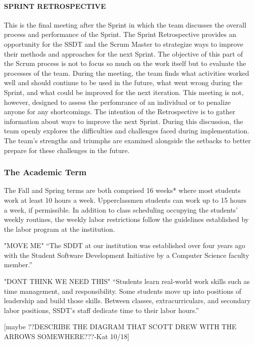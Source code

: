 \paragraph{SPRINT RETROSPECTIVE}
This is the final meeting after the Sprint in which the team discusses the overall process and performance of the Sprint. The Sprint Retrospective provides an opportunity for the SSDT and the Scrum Master to strategize ways to improve their methods and approaches for the next Sprint. The objective of this part of the Scrum process is not to focus so much on the work itself but to evaluate the processes of the team. During the meeting, the team finds what activities worked well and should continue to be used in the future, what went wrong during the Sprint, and what could be improved for the next iteration. This meeting is not, however, designed to assess the perfomrance of an individual or to penalize anyone for any shortcomings. The intention of the Retrospective is to gather information about ways to improve the next Sprint. During this discussion, the team openly explores the difficulties and challenges faced during implementation. The team's strengths and triumphs are examined alongside the setbacks to better prepare for these challenges in the future.

\subsubsection{The Academic Term} 
The Fall and Spring terms are both comprised 16 weeks* where most students work at least 10 hours a week. Upperclassmen students can work up to 15 hours a week, if permissible. In addition to class scheduling occupying the students' weekly routines, the weekly labor restrictions follow the guidelines established by the labor program at the institution.


"MOVE ME" ``The SDDT at our institution was established over four years ago with the Student Software Development Initiative by a Computer Science faculty member.''

"DONT THINK WE NEED THIS" ``Students learn real-world work skills such as time management, and responsibility. Some students move up into positions of leadership and build those skills. Between classes, extracurriculars, and secondary labor positions, SSDT's staff dedicate time to their labor hours.''





[maybe ??DESCRIBE THE DIAGRAM THAT SCOTT DREW WITH THE ARROWS SOMEWHERE???-Kat 10/18]
